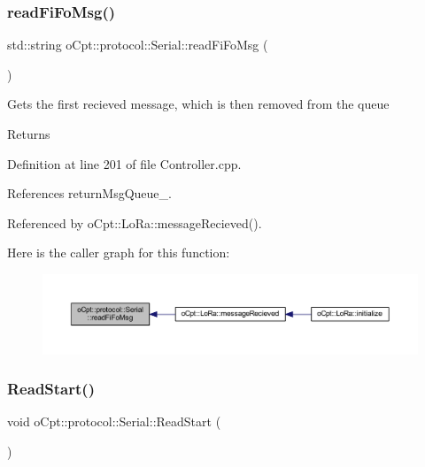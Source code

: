 \subsubsection{\texorpdfstring{read\+Fi\+Fo\+Msg()}{readFiFoMsg()}}
{\footnotesize\ttfamily std\+::string o\+Cpt\+::protocol\+::\+Serial\+::read\+Fi\+Fo\+Msg (\begin{DoxyParamCaption}{ }\end{DoxyParamCaption})}

Gets the first recieved message, which is then removed from the queue \begin{DoxyReturn}{Returns}

\end{DoxyReturn}


Definition at line 201 of file Controller.\+cpp.



References return\+Msg\+Queue\+\_\+.



Referenced by o\+Cpt\+::\+Lo\+Ra\+::message\+Recieved().

Here is the caller graph for this function\+:\nopagebreak
\begin{figure}[H]
\begin{center}
\leavevmode
\includegraphics[width=350pt]{classo_cpt_1_1protocol_1_1_serial_a34fd0ec3f90b067eb7f749f39986d31d_icgraph}
\end{center}
\end{figure}
\hypertarget{classo_cpt_1_1protocol_1_1_serial_a5bf4aa913654c4ebef3c48ec54cf8b03}{}\label{classo_cpt_1_1protocol_1_1_serial_a5bf4aa913654c4ebef3c48ec54cf8b03} 
\subsubsection{\texorpdfstring{Read\+Start()}{ReadStart()}}
{\footnotesize\ttfamily void o\+Cpt\+::protocol\+::\+Serial\+::\+Read\+Start (\begin{DoxyParamCaption}{ }\end{DoxyParamCaption})\hspace{0.3cm}{\ttfamily [protected]}}

